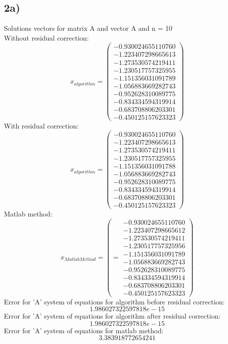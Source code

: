 \documentclass[12pt]{report}
\begin{document}
\subsection{2a)}
Solutions vectors for matrix A and vector A and n = 10 \\
Without residual correction:
\[ x_{algorithm} = \left(\begin{array}{cc}
-0.930024655110760 \\
-1.223407298665613 \\
-1.273530574219411 \\
-1.230517757325955 \\
-1.151356031091789 \\
-1.056883669282743 \\
-0.952628310089775 \\
-0.834334594319914 \\
-0.683708806203301 \\
-0.450125157623323
\end{array} \right)
\]
With residual correction:
\[ x_{algorithm} = \left(\begin{array}{cc}
-0.930024655110760 \\
-1.223407298665613 \\
-1.273530574219411 \\
-1.230517757325955 \\
-1.151356031091788 \\
-1.056883669282743 \\
-0.952628310089775 \\
-0.834334594319914 \\
-0.683708806203301 \\
-0.450125157623323
\end{array} \right)
\]
Matlab method:
\[
x_{Matlab Method} = \left(  = \begin{array}{cc}
-0.930024655110760 \\
-1.223407298665612 \\
-1.273530574219411 \\
-1.230517757325956 \\
-1.151356031091789 \\
-1.056883669282743 \\
-0.952628310089775 \\
-0.834334594319914 \\
-0.683708806203301 \\
-0.450125157623323
\end{array} \right)
\]
Error for 'A' system of equations for algorithm before residual correction: \[ 1.986027322597818e-15 \]
Error for 'A' system of equations for algorithm after residual correction: \[ 1.986027322597818e-15 \]
Error for 'A' system of equations for matlab method: \[ 3.383918772654241 \]
\newpage
\end{document}
